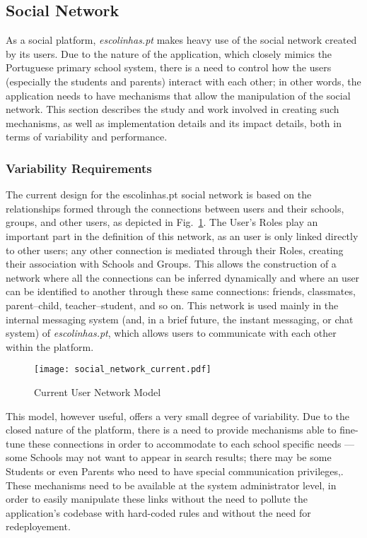 \subsection{Social Network}\label{sec:fa_social_network}

As a social platform, \emph{escolinhas.pt} makes heavy use of the social network created by its users. Due to the nature of the application, which closely mimics the Portuguese primary school system, there is a need to control how the users (especially the students and parents) interact with each other; in other words, the application needs to have mechanisms that allow the manipulation of the social network. This section describes the study and work involved in creating such mechanisms, as well as implementation details and its impact details, both in terms of variability and performance.

\subsubsection{Variability Requirements}\label{sec:fa_social_network_variability_requirements}

The current design for the escolinhas.pt social network is based on the relationships formed through the connections between users and their schools, groups, and other users, as depicted in Fig.~\ref{fig:social_network_current}. The User's Roles play an important part in the definition of this network, as an user is only linked directly to other users; any other connection is mediated through their Roles, creating their association with Schools and Groups. This allows the construction of a network where all the connections can be inferred dynamically and where an user can be identified to another through these same connections: friends, classmates, parent--child, teacher--student, and so on. This network is used mainly in the internal messaging system (and, in a brief future, the instant messaging, or chat system) of \emph{escolinhas.pt}, which allows users to communicate with each other within the platform.

\begin{figure}[H]
  \centering
  \texttt{[image: social\_network\_current.pdf]}
  \caption{Current User Network Model}
  \label{fig:social_network_current}
\end{figure}

This model, however useful, offers a very small degree of variability. Due to the closed nature of the platform, there is a need to provide mechanisms able to fine-tune these connections in order to accommodate to each school specific needs --- some Schools may not want to appear in search results; there may be some Students or even Parents who need to have special communication privileges,. These mechanisms need to be available at the system administrator level, in order to easily manipulate these links without the need to pollute the application's codebase with hard-coded rules and without the need for redeployement.


